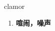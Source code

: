 
\begin{frame}
{\huge clamor}
\begin{center}
\begin{enumerate}\Large
  \item \textbf{喧闹，噪声}
\end{enumerate}
\end{center}
\end{frame}
